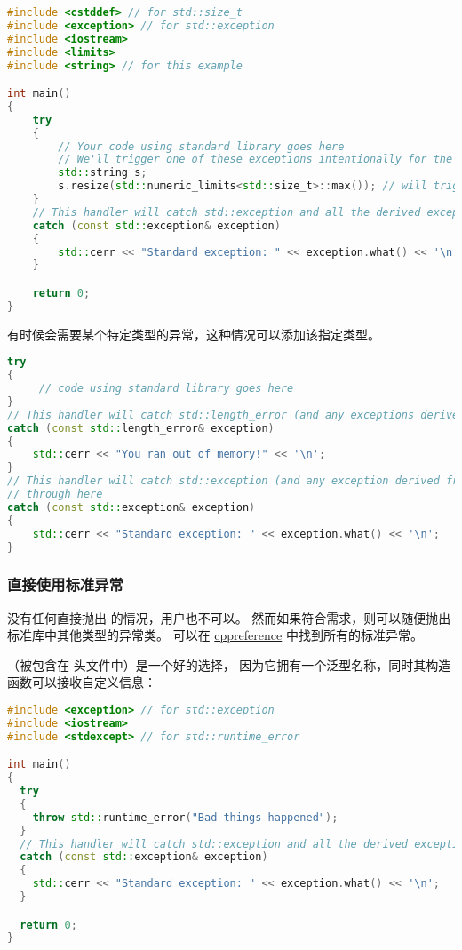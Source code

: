 \documentclass[../../LearnCpp.tex]{subfiles}
\begin{document}
\begin{lstlisting}[language=C++]
#include <cstddef> // for std::size_t
#include <exception> // for std::exception
#include <iostream>
#include <limits>
#include <string> // for this example

int main()
{
    try
    {
        // Your code using standard library goes here
        // We'll trigger one of these exceptions intentionally for the sake of the example
        std::string s;
        s.resize(std::numeric_limits<std::size_t>::max()); // will trigger a std::length_error or allocation exception
    }
    // This handler will catch std::exception and all the derived exceptions too
    catch (const std::exception& exception)
    {
        std::cerr << "Standard exception: " << exception.what() << '\n';
    }

    return 0;
}
\end{lstlisting}

有时候会需要某个特定类型的异常，这种情况可以添加该指定类型。

\begin{lstlisting}[language=C++]
try
{
     // code using standard library goes here
}
// This handler will catch std::length_error (and any exceptions derived from it) here
catch (const std::length_error& exception)
{
    std::cerr << "You ran out of memory!" << '\n';
}
// This handler will catch std::exception (and any exception derived from it) that fall
// through here
catch (const std::exception& exception)
{
    std::cerr << "Standard exception: " << exception.what() << '\n';
}
\end{lstlisting}

\subsubsection*{直接使用标准异常}

没有任何直接抛出  的情况，用户也不可以。
然而如果符合需求，则可以随便抛出标准库中其他类型的异常类。
可以在 \href{https://en.cppreference.com/w/cpp/error/exception}{cppreference} 中找到所有的标准异常。

（被包含在  头文件中）是一个好的选择，
因为它拥有一个泛型名称，同时其构造函数可以接收自定义信息：

\begin{lstlisting}[language=C++]
#include <exception> // for std::exception
#include <iostream>
#include <stdexcept> // for std::runtime_error

int main()
{
  try
  {
    throw std::runtime_error("Bad things happened");
  }
  // This handler will catch std::exception and all the derived exceptions too
  catch (const std::exception& exception)
  {
    std::cerr << "Standard exception: " << exception.what() << '\n';
  }

  return 0;
}
\end{lstlisting}
\end{document}
